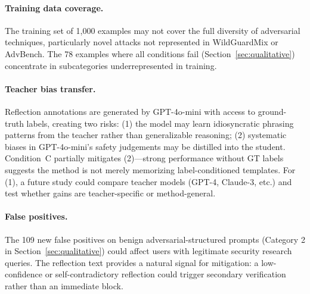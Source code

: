 \documentclass[11pt]{article}
\begin{document}
\paragraph{Training data coverage.}
The training set of 1{,}000 examples may not cover the full diversity of adversarial techniques, particularly novel attacks not represented in WildGuardMix or AdvBench. The 78 examples where all conditions fail (Section~\ref{sec:qualitative}) concentrate in subcategories underrepresented in training.

\paragraph{Teacher bias transfer.}
Reflection annotations are generated by GPT-4o-mini with access to ground-truth labels, creating two risks: (1) the model may learn idiosyncratic phrasing patterns from the teacher rather than generalizable reasoning; (2) systematic biases in GPT-4o-mini's safety judgements may be distilled into the student. Condition~C partially mitigates (2)---strong performance without GT labels suggests the method is not merely memorizing label-conditioned templates. For (1), a future study could compare teacher models (GPT-4, Claude-3, etc.) and test whether gains are teacher-specific or method-general.

\paragraph{False positives.}
The 109 new false positives on benign adversarial-structured prompts (Category 2 in Section~\ref{sec:qualitative}) could affect users with legitimate security research queries. The reflection text provides a natural signal for mitigation: a low-confidence or self-contradictory reflection could trigger secondary verification rather than an immediate block.
\end{document}
